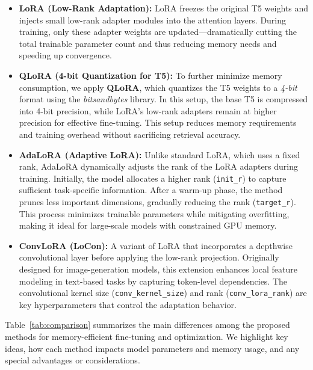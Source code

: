 \begin{itemize}
    \item \textbf{LoRA (Low-Rank Adaptation):} LoRA freezes the original T5 weights and injects small low-rank adapter modules into the attention layers. During training, only these adapter weights are updated—dramatically cutting the total trainable parameter count and thus reducing memory needs and speeding up convergence.

    \item \textbf{QLoRA (4-bit Quantization for T5):} To further minimize memory consumption, we apply \textbf{QLoRA}, which quantizes the T5 weights to a \emph{4-bit} format using the \textit{bitsandbytes} library. In this setup, the base T5 is compressed into 4-bit precision, while LoRA’s low-rank adapters remain at higher precision for effective fine-tuning. This setup reduces memory requirements and training overhead without sacrificing retrieval accuracy.

    \item \textbf{AdaLoRA (Adaptive LoRA):} Unlike standard LoRA, which uses a fixed rank, AdaLoRA dynamically adjusts the rank of the LoRA adapters during training. Initially, the model allocates a higher rank (\texttt{init\_r}) to capture sufficient task-specific information. After a warm-up phase, the method prunes less important dimensions, gradually reducing the rank (\texttt{target\_r}). This process minimizes trainable parameters while mitigating overfitting, making it ideal for large-scale models with constrained GPU memory.

    \item \textbf{ConvLoRA (LoCon):} A variant of LoRA that incorporates a depthwise convolutional layer before applying the low-rank projection. Originally designed for image-generation models, this extension enhances local feature modeling in text-based tasks by capturing token-level dependencies. The convolutional kernel size (\texttt{conv\_kernel\_size}) and rank (\texttt{conv\_lora\_rank}) are key hyperparameters that control the adaptation behavior.
\end{itemize}

Table~\ref{tab:comparison} summarizes the main differences among the proposed methods for memory-efficient fine-tuning and optimization. We highlight key ideas, how each method impacts model parameters and memory usage, and any special advantages or considerations.


